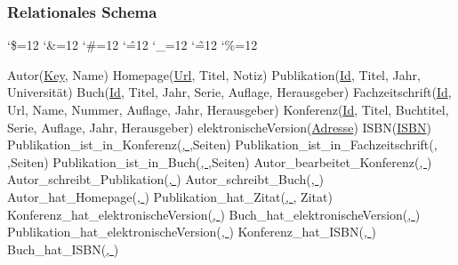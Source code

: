 \documentclass[a4paper,12pt]{article}
\newenvironment{simplechar}{%
	\catcode`\$=12
	\catcode`\&=12
	\catcode`\#=12
	\catcode`\^=12
	\catcode`\_=12
	\catcode`\~=12
	\catcode`\%=12
}{}
\begin{document}
	\subsubsection{Relationales Schema}
	\begin{simplechar}
		\begin{flushleft}

		\begin{small}
			Autor(\uline{Key}, Name) \newline
			Homepage(\uline{Url}, Titel, Notiz)\newline
			Publikation(\uline{Id}, Titel, Jahr, Universität)\newline
			Buch(\uline{Id}, Titel, Jahr, Serie, Auflage, Herausgeber)\newline
			Fachzeitschrift(\uline{Id}, Url, Name, Nummer, Auflage, Jahr, Herausgeber)\newline
			Konferenz(\uline{Id}, Titel, Buchtitel, Serie, Auflage, Jahr, Herausgeber)\newline
			elektronischeVersion(\uline{Adresse})\newline
			ISBN(\uline{ISBN})\newline
			Publikation_ist_in_Konferenz(\uline{, },Seiten)\newline
			Publikation_ist_in_Fachzeitschrift(\uline{, },Seiten)\newline
			Publikation_ist_in_Buch(\uline{, },Seiten)\newline
			Autor_bearbeitet_Konferenz(\uline{, })\newline
			Autor_schreibt_Publikation(\uline{, })\newline
			Autor_schreibt_Buch(\uline{, })\newline
			Autor_hat_Homepage(\uline{, })\newline
			Publikation_hat_Zitat(\uline{, }, Zitat)\newline
			Konferenz_hat_elektronischeVersion(\uline{, })\newline
			Buch_hat_elektronischeVersion(\uline{, })\newline
			Publikation_hat_elektronischeVersion(\uline{, })\newline
			Konferenz_hat_ISBN(\uline{, })\newline
			Buch_hat_ISBN(\uline{, })\newline
			\label{fig:relationalesSchema}
		\end{small}
	\end{flushleft}
	\end{simplechar}
\end{document}
